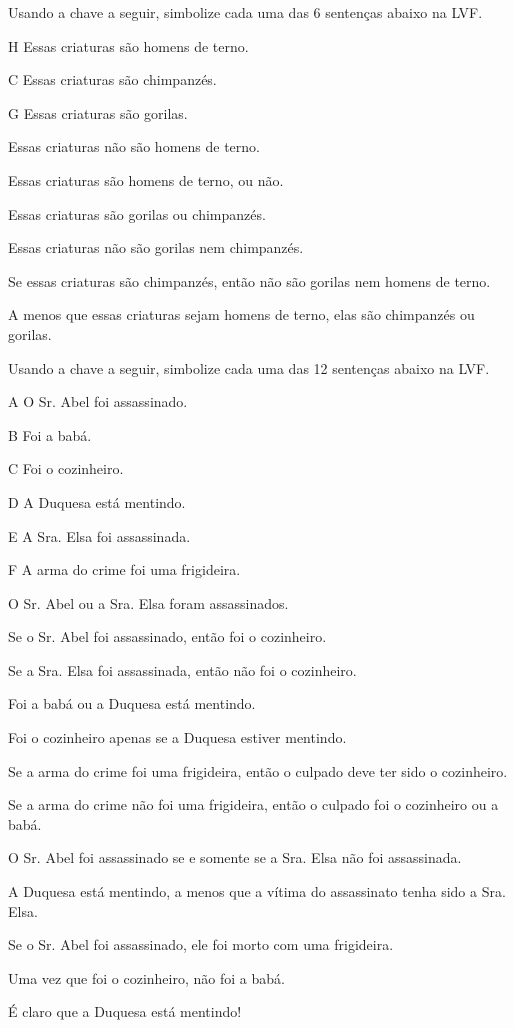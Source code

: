 \practiceproblems
\solutions
\problempart Usando a chave a seguir, simbolize cada uma das 6 sentenças abaixo na LVF.\label{pr.monkeysuits}
	\begin{ekey}
		\item[H] Essas criaturas são homens de terno. 
		\item[C] Essas criaturas são chimpanzés.
		\item[G] Essas criaturas são gorilas.
	\end{ekey}
\begin{earg}
	\item Essas criaturas não são homens de terno.
	\item Essas criaturas são homens de terno, ou não.
	\item Essas criaturas são gorilas ou chimpanzés.
	\item Essas criaturas não são gorilas nem chimpanzés.
	\item Se essas criaturas são chimpanzés, então não são gorilas nem homens de terno.
	\item A menos que essas criaturas sejam homens de terno, elas são chimpanzés ou gorilas.
\end{earg}

\problempart Usando a chave a seguir, simbolize cada uma das 12 sentenças abaixo na LVF.
\begin{ekey}
	\item[A] O Sr. Abel foi assassinado.
	\item[B] Foi a babá.
	\item[C] Foi o cozinheiro.
	\item[D] A Duquesa está mentindo.
	\item[E] A Sra. Elsa foi assassinada.
	\item[F] A arma do crime foi uma frigideira.
\end{ekey}
\begin{earg}
	\item O Sr. Abel ou a Sra. Elsa foram assassinados.
	\item Se o Sr. Abel foi assassinado, então foi o cozinheiro.
	\item Se a Sra. Elsa foi assassinada, então não foi o cozinheiro.
	\item Foi a babá ou a Duquesa está mentindo.
	\item Foi o cozinheiro apenas se a Duquesa estiver mentindo.
	\item Se a arma do crime foi uma frigideira, então o culpado deve ter sido o cozinheiro.
	\item Se a arma do crime não foi uma frigideira, então o culpado foi o cozinheiro ou a babá.
	\item O Sr. Abel foi assassinado se e somente se a Sra. Elsa não foi assassinada.
	\item A Duquesa está mentindo, a menos que a vítima do assassinato tenha sido a Sra. Elsa.
	\item Se o Sr. Abel foi assassinado, ele foi morto com uma frigideira.
	\item Uma vez que foi o cozinheiro, não foi a babá.
	\item É claro que a Duquesa está mentindo!
\end{earg}
\solutions

